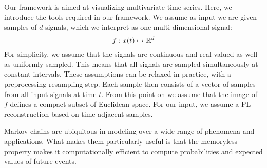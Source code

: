 \label{sec:preliminaries}
Our framework is aimed at visualizing multivariate time-series. Here, we introduce the tools required in our framework. We assume as input we are given samples of $d$ signals, which we interpret as one multi-dimensional signal:
$$f: x(t)\mapsto \mathbb{R}^d$$
For simplicity, we assume that the signals are continuous and real-valued as well as uniformly sampled. This means that all signals are sampled simultaneously at constant intervals. These assumptions can be relaxed in practice, with a preprocessing resampling step.  Each sample then consists of a vector of samples from all input signals at time $t$. 
From this point on we  assume that the image of $f$ defines a compact subset of Euclidean space. For our input, we assume a PL-reconstruction based on time-adjacent samples. 






Markov chains are ubiquitous in modeling over a wide range of phenomena and applications. What makes them particularly useful is that the memoryless property makes it computationally efficient to compute probabilities and expected values of future events.

